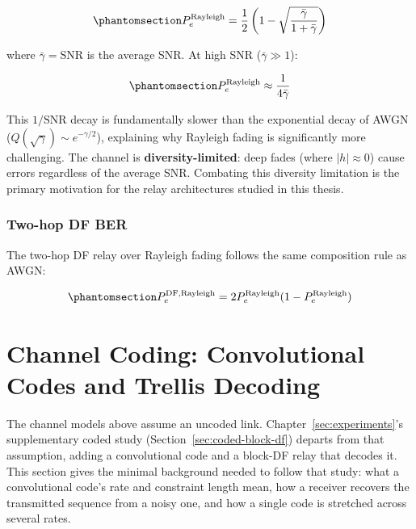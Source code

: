 \begin{equation}\protect\phantomsection\label{eq:rayleigh-ber}{P_e^{\text{Rayleigh}} = \frac{1}{2}\left(1 - \sqrt{\frac{\bar{\gamma}}{1 + \bar{\gamma}}}\right)
}\end{equation}

where \(\bar{\gamma} = \text{SNR}\) is the average SNR. At high SNR (\(\bar{\gamma} \gg 1\)):

\begin{equation}\protect\phantomsection\label{eq:rayleigh-ber-approx}{P_e^{\text{Rayleigh}} \approx \frac{1}{4\bar{\gamma}}
}\end{equation}

This \(1/\text{SNR}\) decay is fundamentally slower than the exponential decay of AWGN (\(Q(\sqrt{\gamma}) \sim e^{-\gamma/2}\)), explaining why Rayleigh fading is significantly more challenging. The channel is \textbf{diversity-limited}: deep fades (where \(|h| \approx 0\)) cause errors regardless of the average SNR. Combating this diversity limitation is the primary motivation for the relay architectures studied in this thesis.

\subsubsection{Two-hop DF BER}\label{sec:rayleigh-two-hop-df-ber}
The two-hop DF relay over Rayleigh fading follows the same composition rule as AWGN:

\begin{equation}\protect\phantomsection\label{eq:df-ber-rayleigh}{P_e^{\text{DF,Rayleigh}} = 2P_e^{\text{Rayleigh}}(1 - P_e^{\text{Rayleigh}})
}\end{equation}

\section{Channel Coding: Convolutional Codes and Trellis Decoding}\label{sec:channel-coding-convolutional-codes}

The channel models above assume an uncoded link. Chapter~\ref{sec:experiments}'s supplementary coded study (Section~\ref{sec:coded-block-df}) departs from that assumption, adding a convolutional code and a block-DF relay that decodes it. This section gives the minimal background needed to follow that study: what a convolutional code's rate and constraint length mean, how a receiver recovers the transmitted sequence from a noisy one, and how a single code is stretched across several rates.

